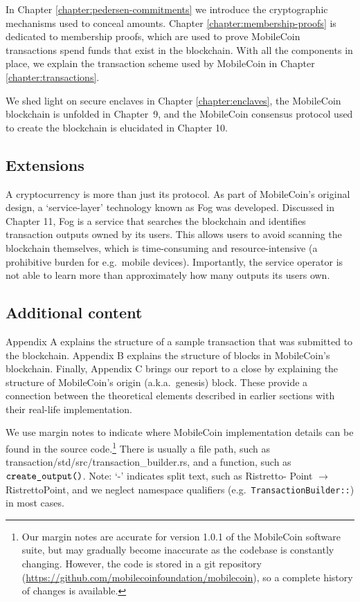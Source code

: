 In Chapter \ref{chapter:pedersen-commitments} we introduce the cryptographic mechanisms used to conceal amounts. Chapter \ref{chapter:membership-proofs} is dedicated to membership proofs, which are used to prove MobileCoin transactions spend funds that exist in the blockchain. With all the components in place, we explain the transaction scheme used by MobileCoin in Chapter \ref{chapter:transactions}.

We shed light on secure enclaves in Chapter \ref{chapter:enclaves}, the MobileCoin blockchain is unfolded in Chapter~9, and the MobileCoin consensus protocol used to create the blockchain is elucidated in Chapter 10.%


\subsection{Extensions}

A cryptocurrency is more than just its protocol. As part of MobileCoin's original design, a `service-layer' technology known as Fog was developed. Discussed in Chapter 11, Fog is a service that searches the blockchain and identifies transaction outputs owned by its users. This allows users to avoid scanning the blockchain themselves, which is time-consuming and resource-intensive (a prohibitive burden for e.g.\ mobile devices). Importantly, the service operator is not able to learn more than approximately how many outputs its users own.%


\subsection{Additional content}
Appendix A explains the structure of a sample transaction that was submitted to the blockchain. Appendix B explains the structure of blocks in MobileCoin's blockchain. Finally, Appendix C brings our report to a close by explaining the structure of MobileCoin's origin (a.k.a.\ genesis) block. These provide a connection between the theoretical elements described in earlier sections with their real-life implementation.

We use margin notes to indicate where MobileCoin implementation details can be found in the source code.\footnote{Our margin notes are accurate for version 1.0.1 of the MobileCoin software suite, but may gradually become inaccurate as the codebase is constantly changing. However, the code is stored in a git repository (\url{https://github.com/mobilecoinfoundation/mobilecoin}), so a complete history of changes is available.} There is usually a file path, such as transaction/std/src/transaction\_builder.rs, and a function, such as \(\textrm{{\tt create\_output()}}\). Note: `-' indicates split text, such as Ristretto- Point $\rightarrow$ RistrettoPoint, and we neglect namespace qualifiers (e.g.\ {\tt TransactionBuilder::}) in most cases.

